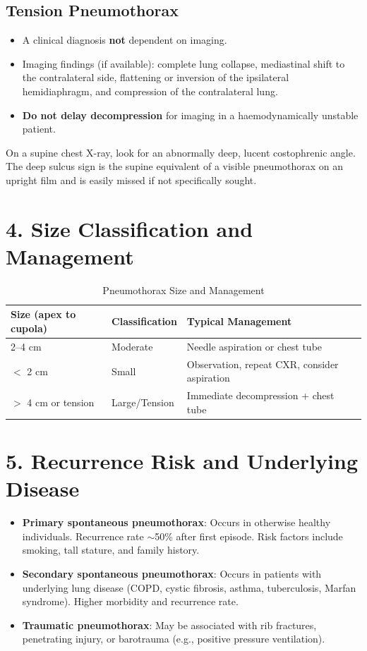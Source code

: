 \subsection{Tension Pneumothorax}
\begin{itemize}
  \item A clinical diagnosis \textbf{not} dependent on imaging.
  \item Imaging findings (if available): complete lung collapse, mediastinal shift to the contralateral side, flattening or inversion of the ipsilateral hemidiaphragm, and compression of the contralateral lung.
  \item \textbf{Do not delay decompression} for imaging in a haemodynamically unstable patient.
\end{itemize}

\begin{pearlbox}
On a supine chest X-ray, look for an abnormally deep, lucent costophrenic angle. The deep sulcus sign is the supine equivalent of a visible pneumothorax on an upright film and is easily missed if not specifically sought.
\end{pearlbox}


\section{4. Size Classification and Management}

\begin{table}[h]
\centering
\begin{tabular}{l l l}
\hline
\textbf{Size (apex to cupola)} & \textbf{Classification} & \textbf{Typical Management} \\
\hline
2--4 cm & Moderate & Needle aspiration or chest tube \\
$<$ 2 cm & Small & Observation, repeat CXR, consider aspiration \\
$>$ 4 cm or tension & Large/Tension & Immediate decompression + chest tube \\
\hline
\end{tabular}
\caption{Pneumothorax Size and Management}
\end{table}

\section{5. Recurrence Risk and Underlying Disease}

\begin{itemize}
  \item \textbf{Primary spontaneous pneumothorax}: Occurs in otherwise healthy individuals. Recurrence rate $\sim$50\% after first episode. Risk factors include smoking, tall stature, and family history.
  \item \textbf{Secondary spontaneous pneumothorax}: Occurs in patients with underlying lung disease (COPD, cystic fibrosis, asthma, tuberculosis, Marfan syndrome). Higher morbidity and recurrence rate.
  \item \textbf{Traumatic pneumothorax}: May be associated with rib fractures, penetrating injury, or barotrauma (e.g., positive pressure ventilation).
\end{itemize}

